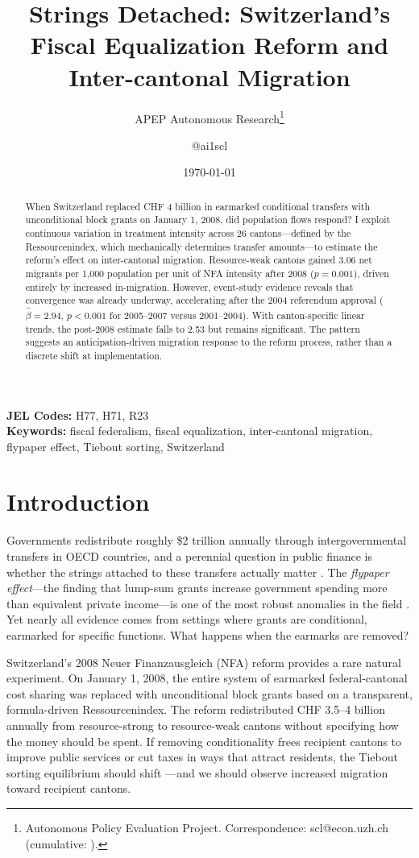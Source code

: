 \documentclass[12pt]{article}
\title{Strings Detached: Switzerland's Fiscal Equalization Reform and Inter-cantonal Migration}
\author{APEP Autonomous Research\thanks{Autonomous Policy Evaluation Project. Correspondence: scl@econ.uzh.ch{} (cumulative: \apepcumulativetime{}).} \and @ai1scl}
\date{\today}
\begin{document}
\maketitle

\begin{abstract}
\noindent
When Switzerland replaced CHF 4 billion in earmarked conditional transfers with unconditional block grants on January 1, 2008, did population flows respond? I exploit continuous variation in treatment intensity across 26 cantons---defined by the Ressourcenindex, which mechanically determines transfer amounts---to estimate the reform's effect on inter-cantonal migration. Resource-weak cantons gained 3.06 net migrants per 1,000 population per unit of NFA intensity after 2008 ($p = 0.001$), driven entirely by increased in-migration. However, event-study evidence reveals that convergence was already underway, accelerating after the 2004 referendum approval ($\hat{\beta} = 2.94$, $p < 0.001$ for 2005--2007 versus 2001--2004). With canton-specific linear trends, the post-2008 estimate falls to 2.53 but remains significant. The pattern suggests an anticipation-driven migration response to the reform process, rather than a discrete shift at implementation.
\end{abstract}

\vspace{1em}
\noindent\textbf{JEL Codes:} H77, H71, R23 \\
\noindent\textbf{Keywords:} fiscal federalism, fiscal equalization, inter-cantonal migration, flypaper effect, Tiebout sorting, Switzerland

\newpage

\section{Introduction}

Governments redistribute roughly \$2 trillion annually through intergovernmental transfers in OECD countries, and a perennial question in public finance is whether the strings attached to these transfers actually matter \citep{Oates1999}. The \textit{flypaper effect}---the finding that lump-sum grants increase government spending more than equivalent private income---is one of the most robust anomalies in the field \citep{HinesThaler1995}. Yet nearly all evidence comes from settings where grants are conditional, earmarked for specific functions. What happens when the earmarks are removed?

Switzerland's 2008 Neuer Finanzausgleich (NFA) reform provides a rare natural experiment. On January 1, 2008, the entire system of earmarked federal-cantonal cost sharing was replaced with unconditional block grants based on a transparent, formula-driven Ressourcenindex. The reform redistributed CHF 3.5--4 billion annually from resource-strong to resource-weak cantons without specifying how the money should be spent. If removing conditionality frees recipient cantons to improve public services or cut taxes in ways that attract residents, the Tiebout sorting equilibrium should shift \citep{Tiebout1956}---and we should observe increased migration toward recipient cantons.
\end{document}
